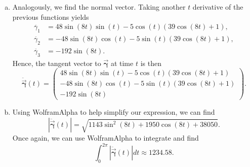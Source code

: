 \documentclass[12pt]{article} %
\newcommand{\curvegamma}{\boldsymbol{\vec{\gamma}}}
\newcommand{\normalgamma}{\boldsymbol{\ddot{\vec{\gamma}}}}
\begin{document}
\begin{solution}
\begin{enumerate}[(a)]
    \item Analogously, we find the normal vector. Taking another $t$ derivative of the previous functions yields
    \begin{align*}
    \ddot{\gamma_1} &= 48\sin(8t)\sin(t)-5\cos(t)(39\cos(8t)+1),\\
    \ddot{\gamma_2} &= -48\sin(8t)\cos(t)-5\sin(t)(39\cos(8t)+1),\\
    \ddot{\gamma_3} &= -192 \sin(8t).
    \end{align*}
   Hence, the tangent vector to $\curvegamma$ at time $t$ is then
    \[
    \normalgamma(t) = \begin{pmatrix}  48\sin(8t)\sin(t)-5\cos(t)(39\cos(8t)+1) \\
                        -48\sin(8t)\cos(t)-5\sin(t)(39\cos(8t)+1) \\
                        -192 \sin(8t) \end{pmatrix}.
    \]

    \item Using WolframAlpha to help simplify our expression, we can find
    \[
    \left| \normalgamma(t) \right| = \sqrt{1143\sin^2(8t)+1950\cos(8t)+38050}.
    \]
    Once again, we can use WolframAlpha to integrate and find
    \[
    \int_0^{2\pi} \left| \normalgamma(t) \right| dt \approx 1234.58.
    \]
\end{enumerate}
\end{solution}
\end{document}
